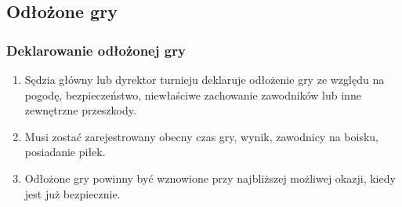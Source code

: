 \documentclass[11pt,a4paper]{article}
\begin{document}
\subsection{Odłożone gry}

\subsubsection{Deklarowanie odłożonej gry}
\begin{enumerate}
  \item Sędzia główny lub dyrektor turnieju deklaruje odłożenie gry ze względu na pogodę, bezpieczeństwo, niewłaściwe zachowanie zawodników lub inne zewnętrzne przeszkody.
  \item Musi zostać zarejestrowany obecny czas gry, wynik, zawodnicy na boisku, posiadanie piłek.
  \item Odłożone gry powinny być wznowione przy najbliższej możliwej okazji, kiedy jest już bezpiecznie.
\end{enumerate}
\end{document}
